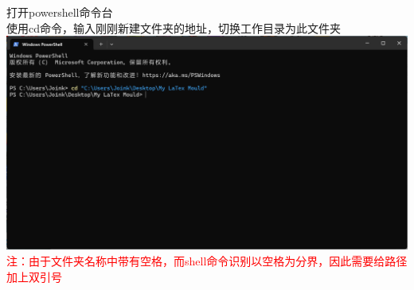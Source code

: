 \documentclass[12pt,a4paper,UTF8]{article}
\begin{document}
\begin{enumerate}
        打开powershell命令台\\
        使用cd命令，输入刚刚新建文件夹的地址，切换工作目录为此文件夹\\[6pt]
        \includegraphics[scale=0.25]{pictures/git/14_2.png}\\
        \textcolor{red}{注：由于文件夹名称中带有空格，而shell命令识别以空格为分界，因此需要给路径加上双引号}


\end{enumerate}
\end{document}
